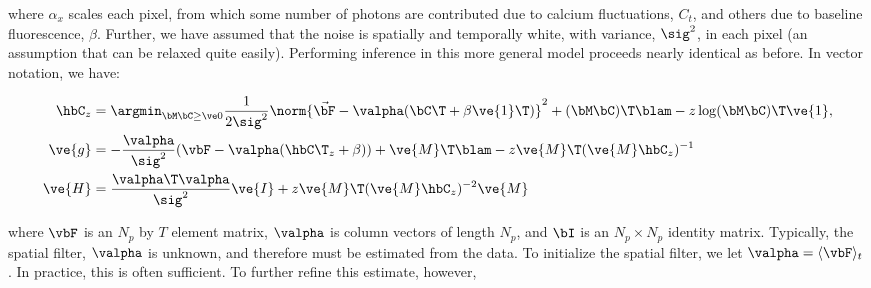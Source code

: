 \noindent where $\alpha_x$ scales each pixel, from which some number of photons are contributed due to calcium fluctuations, $C_t$, and others due to baseline fluorescence, $\beta$.  Further, we have assumed that the noise is spatially and temporally white, with variance, $\sig^2$, in each pixel (an assumption that can be relaxed quite easily).  Performing inference in this more general model proceeds nearly identical as before. In vector notation, we have:

\begin{align} 
\hbC_{\zzz} 
&= \az  \frac{1}{2 \sig^2} \norm{\vec{\bF} - \valpha (\bC\T +\beta\ve{1}\T)}^2 + (\bM \bC )\T \blam  - \zzz \log(\bM \bC)\T\ve{1},  \label{eq:eta4}\\
\ve{g} &= -\frac{\valpha}{\sig^2}(\vbF -\valpha({\hbC\T}_{\zzz} + \beta)) + \ve{M}\T\blam - \zzz \ve{M}\T (\ve{M} \hbC_{\zzz})^{-1} \label{eq:g2} \\
\ve{H} &= \frac{\valpha\T \valpha}{\sig^2} \ve{I} + \zzz \ve{M}\T (\ve{M} \hbC_{\zzz})^{-2} \ve{M} \label{eq:H2}
\end{align}

\noindent where $\vbF$ is an $N_p$ by $T$ element matrix, $\valpha$ is column vectors of length $N_p$, and $\bI$ is an $N_p \times N_p$ identity matrix.  Typically, the spatial filter, $\valpha$ is unknown, and therefore must be estimated from the data.  To initialize the spatial filter, we let $\valpha=\langle \vbF \rangle_t$.  In practice, this is often sufficient.  To further refine this estimate, however, 

